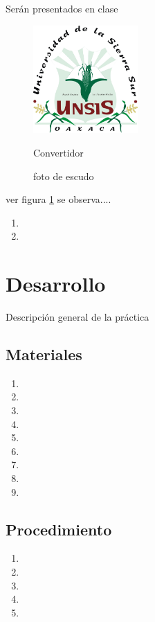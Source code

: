 \documentclass[letterpaper,12pt]{extarticle}%
\begin{document}
\begin{multicols}{2}
	Serán presentados en clase    
		\begin{figure}[H]
		\begin{center}
		\includegraphics[width=4cm]{imag//logColor.jpg}
		\caption{foto de escudo}
		Convertidor
		\label{figura}
		\end{center}
 		\end{figure}

		ver figura \ref{figura} se observa....

    
    \begin{enumerate}
    \item 
    \item
    \end{enumerate}
		
	\section{Desarrollo}
	
	Descripción general de la práctica
	
	\subsection{Materiales}	
	
	\begin{enumerate}
	    \item 
	    \item 
	    \item 
	    \item 
	    \item 
	    \item 
	    \item 
	    \item 
	    \item 
	\end{enumerate}
	
	\subsection{Procedimiento}
	\renewcommand{\labelenumi}{\arabic{enumi}.}
	\begin{enumerate}
		\item 
		
		\item 
		
		\item
		
		\item
		
		\item
		
	\end{enumerate}
    \end{multicols}
    
\end{document}
